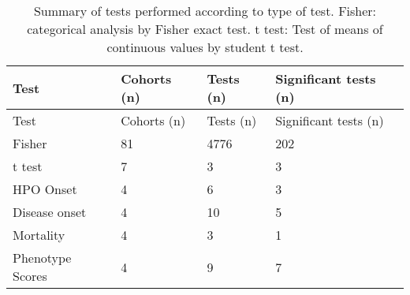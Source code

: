 
\begin{table}
\centering
\begin{tabular}{llll}
\toprule
\textbf{Test} & \textbf{Cohorts (n)} & \textbf{Tests (n)} & \textbf{Significant tests (n)}\\
\midrule
Test & Cohorts (n) & Tests (n) & Significant tests (n)\\
Fisher & 81 & 4776 & 202\\t test & 7 & 3 & 3\\
HPO Onset & 4 & 6 & 3\\
Disease onset & 4 & 10 & 5\\
Mortality & 4 & 3 & 1\\
Phenotype Scores & 4 & 9 & 7\\
\bottomrule
\end{tabular}
\caption{Summary of tests performed according to type of test. Fisher: categorical analysis by Fisher exact test. t test: Test of means of continuous values by student t test.}
\label{tab:to_do}
\end{table}
